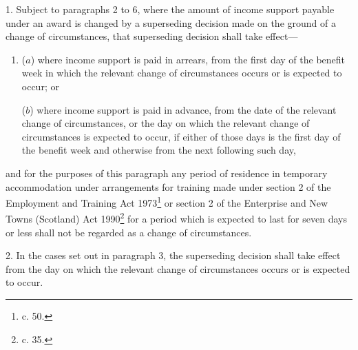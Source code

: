 \documentclass[12pt,a4paper]{article}
\begin{document}
1.  Subject to paragraphs 2 to 6, where the amount of income support payable under an award is changed by a superseding decision made on the ground of a change of circumstances, that superseding decision shall take effect—
\begin{enumerate}\item[]
($a$) where income support is paid in arrears, from the first day of the benefit week in which the relevant change of circumstances occurs or is expected to occur; or

($b$) where income support is paid in advance, from the date of the relevant change of circumstances, or the day on which the relevant change of circumstances is expected to occur, if either of those days is the first day of the benefit week and otherwise from the next following such day,
\end{enumerate}
and for the purposes of this paragraph any period of residence in temporary accommodation under arrangements for training made under section 2 of the Employment and Training Act 1973\footnote{ c. 50.} or section 2 of the Enterprise and New Towns (Scotland) Act 1990\footnote{ c. 35.} for a period which is expected to last for seven days or less shall not be regarded as a change of circumstances.

\medskip

2.  In the cases set out in paragraph 3, the superseding decision shall take effect from the day on which the relevant change of circumstances occurs or is expected to occur.

\medskip
\end{document}
